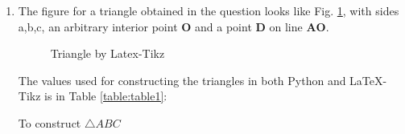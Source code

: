 \renewcommand{\vec}[1]{\mathbf{#1}}
\renewcommand{\theequation}{\theenumi}
\begin{enumerate}[label=\thesection.\arabic*.,ref=\thesection.\theenumi]

\item
The figure for a triangle obtained in the question looks like Fig. \ref{fig:similar}, with sides a,b,c, an arbitrary interior point $\vec{O}$ and a point $\vec{D}$ on line $\vec{AO}$.  
\begin{figure}[!ht]
\centering
\resizebox{\columnwidth}{!}{}
\caption{Triangle by Latex-Tikz}
\label{fig:similar}	
\end{figure}

The values used for constructing the triangles in both Python and \LaTeX{}-Tikz is in Table \ref{table:table1}:\\
\begin{table}[ht]
    \begin{center}
    	
  \caption{To construct $\triangle ABC$}
   \label{table:table1}
   \end{center}	
\end{table}

\end{enumerate}
